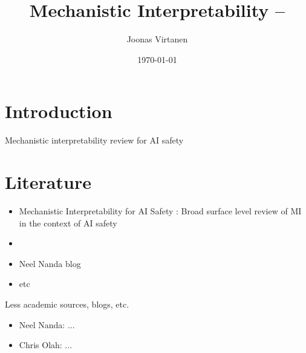 \documentclass[12pt, a4paper]{article}
\title{Mechanistic Interpretability -- }
\author{Joonas Virtanen}
\date{\today}
\begin{document}
\maketitle

\section{Introduction}
Mechanistic interpretability review for AI safety \cite{bereska2024}

\section*{Literature}
\begin{itemize}
    \item Mechanistic Interpretability for AI Safety \cite{bereska2024}: Broad surface level review of MI in the context of AI safety
    \item 
    \item Neel Nanda blog
    \item etc
\end{itemize}

Less academic sources, blogs, etc.
\begin{itemize}
    \item Neel Nanda: ...
    \item Chris Olah: ...
\end{itemize}


\printbibliography
\end{document}
